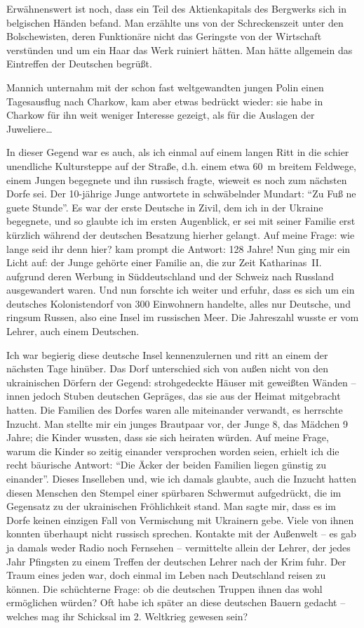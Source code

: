 Erwähnenswert ist noch, dass ein Teil des Aktienkapitals des Bergwerks sich in belgischen Händen befand. Man erzählte uns von der Schreckenszeit unter den Bolschewisten, deren Funktionäre nicht das Geringste von der Wirtschaft verstünden und um ein Haar das Werk ruiniert hätten. Man hätte allgemein das Eintreffen der Deutschen begrüßt.

Mannich unternahm mit der schon fast weltgewandten jungen Polin einen Tagesausflug nach Charkow, kam aber etwas bedrückt wieder: sie habe in Charkow für ihn weit weniger Interesse gezeigt, als für die Auslagen der Juweliere\dots

In dieser Gegend war es auch, als ich einmal auf einem langen Ritt in die schier unendliche Kultursteppe auf der Straße, d.h. einem etwa 60~m breitem Feldwege, einem Jungen begegnete und ihn russisch fragte, wieweit es noch zum nächsten Dorfe sei. Der 10-jährige Junge antwortete in schwäbelnder Mundart: \enquote{Zu Fuß ne guete Stunde}. Es war der erste Deutsche in Zivil, dem ich in der Ukraine begegnete, und so glaubte ich im ersten Augenblick, er sei mit seiner Familie erst kürzlich während der deutschen Besatzung hierher gelangt. Auf meine Frage: wie lange seid ihr denn hier? kam prompt die Antwort: 128 Jahre! Nun ging mir ein Licht auf: der Junge gehörte einer Familie an, die zur Zeit Katharinas~II. aufgrund deren Werbung in Süddeutschland und der Schweiz nach Russland ausgewandert waren. Und nun forschte ich weiter und erfuhr, dass es sich um ein deutsches Kolonistendorf von 300 Einwohnern handelte, alles nur Deutsche, und ringsum Russen, also eine Insel im russischen Meer. Die Jahreszahl wusste er vom Lehrer, auch einem Deutschen.

Ich war begierig diese deutsche Insel kennenzulernen und ritt an einem der nächsten Tage hinüber. Das Dorf unterschied sich von außen nicht von den ukrainischen Dörfern der Gegend: strohgedeckte Häuser mit geweißten Wänden -- innen jedoch Stuben deutschen Gepräges, das sie aus der Heimat mitgebracht hatten. Die Familien des Dorfes waren alle miteinander verwandt, es herrschte Inzucht. Man stellte mir ein junges Brautpaar vor, der Junge 8, das Mädchen 9 Jahre; die Kinder wussten, dass sie sich heiraten würden. Auf meine Frage, warum die Kinder so zeitig einander versprochen worden seien, erhielt ich die recht bäurische Antwort: \enquote{Die Äcker der beiden Familien liegen günstig zu einander}. Dieses Inselleben und, wie ich damals glaubte, auch die Inzucht hatten diesen Menschen den Stempel einer spürbaren Schwermut aufgedrückt, die im Gegensatz zu der ukrainischen Fröhlichkeit stand. Man sagte mir, dass es im Dorfe keinen einzigen Fall von Vermischung mit Ukrainern gebe. Viele von ihnen konnten überhaupt nicht russisch sprechen. Kontakte mit der Außenwelt -- es gab ja damals weder Radio noch Fernsehen -- vermittelte allein der Lehrer, der jedes Jahr Pfingsten zu einem Treffen der deutschen Lehrer nach der Krim fuhr. Der Traum eines jeden war, doch einmal im Leben nach Deutschland reisen zu können. Die schüchterne Frage: ob die deutschen Truppen ihnen das wohl ermöglichen würden? Oft habe ich später an diese deutschen Bauern gedacht -- welches mag ihr Schicksal im 2. Weltkrieg gewesen sein?

